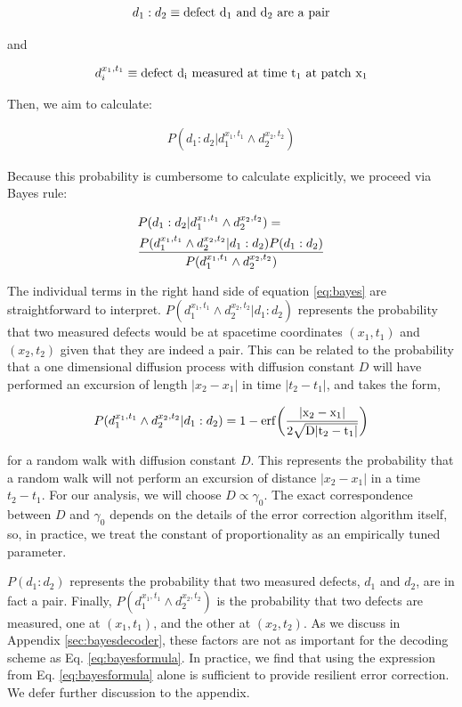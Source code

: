 \documentclass[twocolumn,superscriptaddress,aps,prb,floatfix]{revtex4-1}
\begin{document}
\begin{align}
d_1 : d_2 \equiv \rm{defect}\ d_1\ \rm{and}\ d_2\ \rm{are\ a\ pair}
\end{align}

and

\begin{align}
d_i^{x_1,t_1} \equiv \rm{defect}\ d_i\ \rm{measured\ at\ time}\ t_1\ \rm{at\ patch}\ x_1
\end{align}

Then, we aim to calculate:

\begin{align}
P(d_1:d_2 | d_1^{x_1,t_1} \wedge d_2^{x_2,t_2})
\end{align}

Because this probability is cumbersome to calculate explicitly, we proceed via Bayes rule:

\begin{align}
\label{eq:bayes}
&P(d_1:d_2 | d_1^{x_1,t_1} \wedge d_2^{x_2,t_2}) = \\ \notag
&\frac{P(d_1^{x_1,t_1} \wedge d_2^{x_2,t_2} | d_1:d_2) P(d_1 : d_2)}{P(d_1^{x_1,t_1}\wedge d_2^{x_2,t_2})}
\end{align}

The individual terms in the right hand side of equation \ref{eq:bayes} are straightforward to interpret.  $P(d_1^{x_1,t_1} \wedge d_2^{x_2,t_2} | d_1:d_2)$ represents the probability that two measured defects would be at spacetime coordinates $(x_1,t_1)$ and $(x_2,t_2)$ given that they are indeed a pair.  This can be related to the probability that a one dimensional diffusion process with diffusion constant $D$ will have performed an excursion of length $|x_2-x_1|$ in time $|t_2-t_1|$, and takes the form,

\begin{align}
\label{eq:bayesformula}
P(d_1^{x_1,t_1} \wedge d_2^{x_2,t_2} | d_1:d_2) = 1 - \rm{erf}\bigg(\frac{|x_2-x_1|}{2\sqrt{D |t_2 - t_1|}}\bigg) 
\end{align}

for a random walk with diffusion constant $D$.  This represents the probability that a random walk will not perform an excursion of distance $|x_2-x_1|$ in a time $t_2 - t_1$.  For our analysis, we will choose $D\propto \gamma_0$.  The exact correspondence between $D$ and $\gamma_0$ depends on the details of the error correction algorithm itself, so, in practice, we treat the constant of proportionality as an empirically tuned parameter.

$P(d_1 : d_2)$ represents the probability that two measured defects, $d_1$ and $d_2$, are in fact a pair.  Finally, $P(d_1^{x_1,t_1}\wedge d_2^{x_2,t_2})$ is the probability that two defects are measured, one at $(x_1,t_1)$, and the other at $(x_2,t_2)$.  As we discuss in Appendix \ref{sec:bayesdecoder}, these factors are not as important for the decoding scheme as Eq. \ref{eq:bayesformula}.  In practice, we find that using the expression from Eq. \ref{eq:bayesformula} alone is sufficient to provide resilient error correction.  We defer further discussion to the appendix.
 
\end{document}
